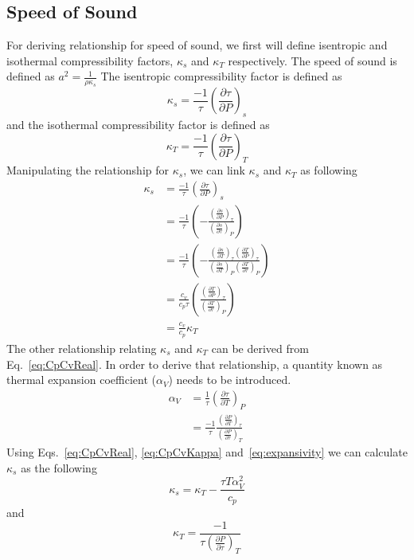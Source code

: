 \documentclass[11pt]{article}
\newcommand{\MarginPar}[1]{\marginpar{%
\vskip-\baselineskip %
\raggedright\tiny\sffamily
\hrule\smallskip{\color{red}#1}\par\smallskip\hrule}}
\begin{document}
\subsection*{Speed of Sound}
\label{sec:AppdxSpeedofSound}
For deriving relationship for speed of sound, we first will define isentropic and isothermal compressibility factors, $\kappa_{s}$ and $\kappa_{T}$ respectively. The speed of sound is defined as $a^{2} = \frac{1}{\rho \kappa_{s}}$
The isentropic compressibility factor is defined as 
\MarginPar{consistencify}
\begin{equation}
\kappa_{s} = \frac{-1}{\tau} \left(\frac{\partial \tau}{\partial P} \right)_{s} 
\end{equation}
and the isothermal compressibility factor is defined as 
\begin{equation}
\kappa_{T} = \frac{-1}{\tau} \left(\frac{\partial \tau}{\partial P} \right)_{T}
\end{equation}
Manipulating the relationship for $\kappa_{s}$, we can link $\kappa_{s}$ and $\kappa_{T}$ as following 
\begin{align}
\kappa_{s} &= \frac{-1}{\tau} \left(\frac{\partial \tau}{\partial P} \right)_{s} \\
           &= \frac{-1}{\tau} \left(-\frac{\left(\frac{\partial s}{\partial P}\right)_\tau}{\left(\frac{\partial s}{\partial \tau} \right)_P} \right) \\
           &= \frac{-1}{\tau} \left( -\frac{\left(\frac{\partial s}{\partial T}\right)_\tau \left(\frac{\partial T}{\partial P}\right)_\tau}{\left(\frac{\partial s}{\partial T} \right)_P \left(\frac{\partial T}{\partial \tau} \right)_P}  \right) \\
           &= \frac{c_{v}}{c_{p}\tau} \left(\frac{\left(\frac{\partial T}{\partial P}\right)_\tau}{\left(\frac{\partial T}{\partial \tau} \right)_P}  \right) \\
           & = \frac{c_{v}}{c_{p}}\kappa_{T} 
           \label{eq:CpCvKappa}
           \end{align}
The other relationship relating $\kappa_{s}$ and $\kappa_{T}$ can be derived from Eq.~\ref{eq:CpCvReal}. In order to derive that relationship, a quantity known as thermal expansion coefficient ($\alpha_{V}$) needs to be introduced. 
\begin{align}
\alpha_{V} &= \frac{1}{\tau} \left(\frac{\partial \tau}{\partial T} \right)_{P} \\
           &= \frac{-1}{\tau} \frac{\left(\frac{\partial P}{\partial T} \right)_{\tau}}{\left(\frac{\partial P}{\partial \tau} \right)_{T} }
           \label{eq:expansivity}
           \end{align}
       Using Eqs.~\ref{eq:CpCvReal}, \ref{eq:CpCvKappa} and~\ref{eq:expansivity} we can calculate $\kappa_{s}$ as the following 
   \begin{equation}
    \kappa_{s} = \kappa_{T} - \frac{\tau T \alpha_{V}^{2}}{c_{p}}
    \end{equation}
    and 
       \begin{equation}
    \kappa_{T} =  \frac{-1}{\tau \left(\frac{\partial P}{\partial \tau} \right)_{T} }
    \end{equation}
\end{document}
